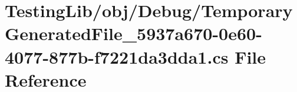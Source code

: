 \hypertarget{_testing_lib_2obj_2_debug_2_temporary_generated_file__5937a670-0e60-4077-877b-f7221da3dda1_8cs}{\section{Testing\+Lib/obj/\+Debug/\+Temporary\+Generated\+File\+\_\+5937a670-\/0e60-\/4077-\/877b-\/f7221da3dda1.cs File Reference}
\label{_testing_lib_2obj_2_debug_2_temporary_generated_file__5937a670-0e60-4077-877b-f7221da3dda1_8cs}
}
